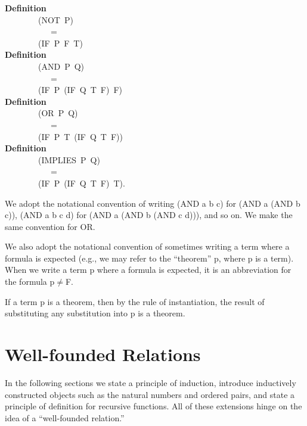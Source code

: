 \documentclass[10pt]{book}
\newenvironment{pubasis}{\begin{flushleft}}{\end{flushleft}}
\newcommand{\axiomordefinition}[1]{\vspace{6pt}\Large\textsf{\textbf{#1}}\normalsize}
\begin{document}
\begin{pubasis}
\axiomordefinition{Definition}\\
~~~~~~~~(NOT~P)\\
~~~~~~~~~~~=\\
~~~~~~~~(IF~P~F~T)\\

\axiomordefinition{Definition}\\
~~~~~~~~(AND~P~Q)\\
~~~~~~~~~~~=\\
~~~~~~~~(IF~P~(IF~Q~T~F)~F)\\

\axiomordefinition{Definition}\\
~~~~~~~~(OR~P~Q)\\
~~~~~~~~~~~=\\
~~~~~~~~(IF~P~T~(IF~Q~T~F))\\

\axiomordefinition{Definition}\\
~~~~~~~~(IMPLIES~P~Q)\\
~~~~~~~~~~~=\\
~~~~~~~~(IF~P~(IF~Q~T~F)~T).\\
\end{pubasis}
We adopt the notational convention of writing (AND a b c)
for (AND a (AND  b c)), (AND a b c d) for (AND a (AND b (AND c d))), and
so on.  We make the same convention for OR.

We also adopt
the notational convention of sometimes writing a term where a formula
is expected (e.g., we may refer to the ``theorem'' p, where p is a term).
When we write a term p where a formula is expected,
it is an abbreviation for the formula p$\neq$F.

If a term p is a theorem, then by the rule of instantiation,
the result of substituting any substitution into p is a theorem.

\hrulefill 

\section{Well-founded Relations}
In the following sections we  state a principle of induction,
introduce inductively constructed objects such as the 
natural numbers and ordered pairs, and state a principle of definition
for recursive functions.  
All of these extensions hinge on the idea of a ``well-founded relation.''
\end{document}
